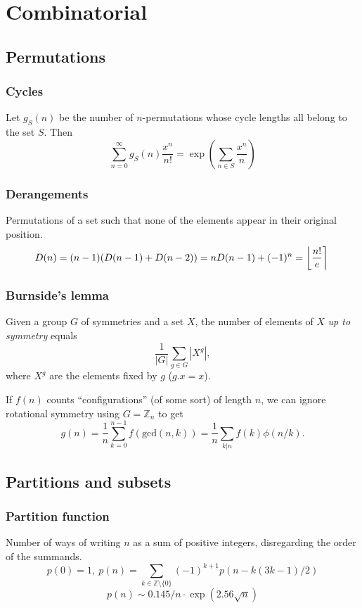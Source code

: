 \chapter{Combinatorial}

\section{Permutations}

	\subsection{Cycles}
		Let $g_S(n)$ be the number of $n$-permutations whose cycle lengths all belong to the set $S$. Then
		$$\sum_{n=0} ^\infty g_S(n) \frac{x^n}{n!} = \exp\left(\sum_{n\in S} \frac{x^n} {n} \right)$$

	\subsection{Derangements}
		Permutations of a set such that none of the elements appear in their original position.
		\[ \mkern-2mu D(n) = (n-1)(D(n-1)+D(n-2)) = n D(n-1)+(-1)^n = \left\lfloor\frac{n!}{e}\right\rceil \]

	\subsection{Burnside's lemma} %
		Given a group $G$ of symmetries and a set $X$, the number of elements of $X$ \emph{up to symmetry} equals
		 \[ {\frac {1}{|G|}}\sum _{{g\in G}}|X^{g}|, \]
		 where $X^{g}$ are the elements fixed by $g$ ($g.x = x$).

		 If $f(n)$ counts ``configurations'' (of some sort) of length $n$, we can ignore rotational symmetry using $G = \mathbb Z_n$ to get
		 \[ g(n) = \frac 1 n \sum_{k=0}^{n-1}{f(\text{gcd}(n, k))} = \frac 1 n \sum_{k|n}{f(k)\phi(n/k)}. \]


\section{Partitions and subsets}
	\subsection{Partition function}
		Number of ways of writing $n$ as a sum of positive integers, disregarding the order of the summands.
		\[ p(0) = 1,\ p(n) = \sum_{k \in \mathbb Z \setminus \{0\}}{(-1)^{k+1} p(n - k(3k-1) / 2)} \]
		\[ p(n) \sim 0.145 / n \cdot \exp(2.56 \sqrt{n}) \]

